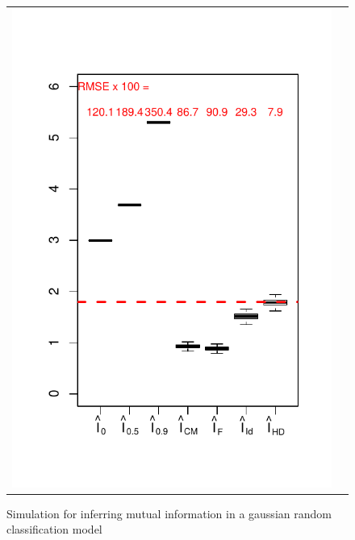 \begin{figure}
\begin{tabular}{cc}
\includegraphics[scale = 0.5]{../../info_theory_sims/fig2_with_Id.pdf}
\end{tabular}
\caption{Simulation for inferring mutual information in a gaussian random classification model}
\label{fig:gaussian_sim}
\end{figure}

